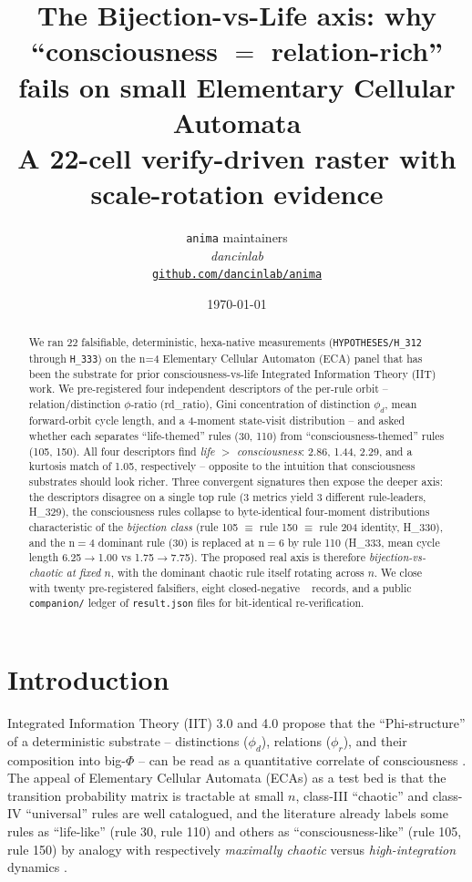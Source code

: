 \documentclass[11pt,a4paper]{article}
\title{
  \textbf{The Bijection-vs-Life axis: why ``consciousness $=$ relation-rich'' fails on small Elementary Cellular Automata}\\[4pt]
  \large A 22-cell verify-driven raster with scale-rotation evidence
}
\author{
  \texttt{anima} maintainers\\
  \normalsize\textit{dancinlab}\\[2pt]
  \normalsize\href{https://github.com/dancinlab/anima}{\texttt{github.com/dancinlab/anima}}
}
\date{\today}
\providecommand{\tierRed}{🔴}
\begin{document}
\maketitle

\begin{abstract}
We ran 22 falsifiable, deterministic, hexa-native measurements
(\texttt{HYPOTHESES/H\_312} through \texttt{H\_333}) on the
n=4 Elementary Cellular Automaton (ECA) panel that has been the substrate
for prior consciousness-vs-life Integrated Information Theory (IIT) work.
We pre-registered four
independent descriptors of the per-rule orbit -- relation/distinction
$\phi$-ratio (rd\_ratio), Gini concentration of distinction $\phi_d$,
mean forward-orbit cycle length, and a 4-moment state-visit
distribution -- and asked whether each separates
``life-themed'' rules (\textsc{30}, \textsc{110}) from
``consciousness-themed'' rules (\textsc{105}, \textsc{150}).
All four descriptors find \emph{life $>$ consciousness}: 2.86, 1.44, 2.29,
and a kurtosis match of 1.05, respectively -- opposite to the
intuition that consciousness substrates should look richer.
Three convergent signatures then expose the deeper axis: the descriptors
disagree on a single top rule (3 metrics yield 3 different rule-leaders,
H\_329), the consciousness rules collapse to byte-identical four-moment
distributions characteristic of the \emph{bijection class}
(rule 105 $\equiv$ rule 150 $\equiv$ rule 204 identity, H\_330), and
the n$=$4 dominant rule (\textsc{30}) is replaced at n$=$6 by
rule \textsc{110} (H\_333, mean cycle length 6.25$\to$1.00 vs 1.75$\to$7.75).
The proposed real axis is therefore
\emph{bijection-vs-chaotic at fixed $n$}, with the dominant chaotic rule
itself rotating across $n$. We close with twenty pre-registered
falsifiers, eight closed-negative \tierRed\ records, and a public
\texttt{companion/} ledger of \texttt{result.json} files for bit-identical
re-verification.
\end{abstract}

\section{Introduction}
\label{sec:intro}

Integrated Information Theory (IIT) 3.0 and 4.0 propose that the
``Phi-structure'' of a deterministic substrate -- distinctions
($\phi_d$), relations ($\phi_r$), and their composition into big-$\Phi$
-- can be read as a quantitative correlate of consciousness
\citep{tononi2016iit,oizumi2014phenomenology,albantakis2023iit4}. The
appeal of Elementary Cellular Automata (ECAs)
\citep{wolfram1984universality,langton1990edgeofchaos} as a test bed is
that the transition probability matrix is tractable at small $n$,
class-III ``chaotic'' and class-IV ``universal'' rules are well
catalogued, and the literature already labels some rules as
``life-like'' (rule 30, rule 110) and others as
``consciousness-like'' (rule 105, rule 150) by analogy with
respectively
\emph{maximally chaotic} versus \emph{high-integration} dynamics
\citep{albantakis2015evolution}.
\end{document}
